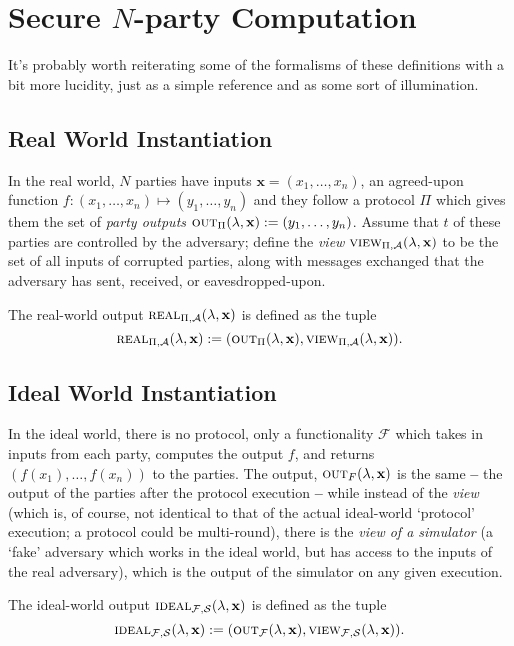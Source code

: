 \section{Secure $N$-party Computation}

It's probably worth reiterating some of the formalisms of these definitions with a bit more lucidity, just as a simple reference and as some sort of illumination.

\subsection{Real World Instantiation} In the real world, $N$ parties have inputs $\mathbf{x}=(x_1,\dots,x_n)$, an agreed-upon function $f:(x_1,\dots,x_n)\mapsto(y_1,\dots,y_n)$ and they follow a protocol $\Pi$ which gives them the set of \textit{party outputs} $\textsc{out}_{\Pi}(\lambda,\mathbf{x}):=(y_1,\dots, y_n)$. Assume that $t$ of these parties are controlled by the adversary; define the \textit{view} $\textsc{view}_{\Pi,\mathcal{A}}(\lambda, \mathbf{x})$ to be the set of all inputs of corrupted parties, along with messages exchanged that the adversary has sent, received, or eavesdropped-upon.

\begin{definition} The real-world output $\textsc{real}_{\Pi,\mathcal{A}}(\lambda,\mathbf{x})$ is defined as the tuple
	$$\textsc{real}_{\Pi,\mathcal{A}}(\lambda,\mathbf{x}):=(\textsc{out}_{\Pi}(\lambda,\mathbf{x}),\textsc{view}_{\Pi,\mathcal{A}}(\lambda, \mathbf{x})).$$	
\end{definition}

\subsection{Ideal World Instantiation} In the ideal world, there is no protocol, only a functionality $\mathcal{F}$ which takes in inputs from each party, computes the output $f$, and returns $(f(x_1),\dots,f(x_n))$ to the parties. The output, $\textsc{out}_{F}(\lambda,\mathbf{x})$ is the same \textbf{--} the output of the parties after the protocol execution \textbf{--} while instead of the \textit{view} (which is, of course, not identical to that of the actual ideal-world `protocol' execution; a protocol could be multi-round), there is the \textit{view of a simulator} (a `fake' adversary which works in the ideal world, but has access to the inputs of the real adversary), which is the output of the simulator on any given execution. 

\begin{definition} The ideal-world output $\textsc{ideal}_{\mathcal{F},\mathcal{S}}(\lambda,\mathbf{x})$ is defined as the tuple
$$\textsc{ideal}_{\mathcal{F},\mathcal{S}}(\lambda,\mathbf{x}):=(\textsc{out}_{\mathcal{F}}(\lambda,\mathbf{x}),\textsc{view}_{\mathcal{F},\mathcal{S}}(\lambda, \mathbf{x})).$$	
\end{definition}

